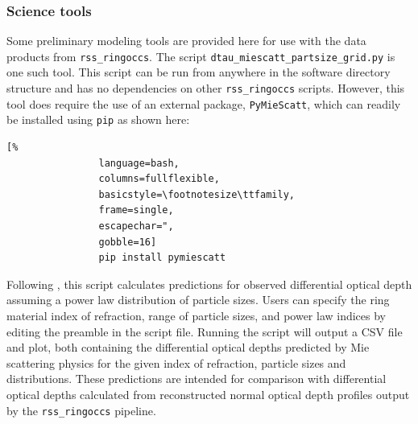 \documentclass[titlepage, 12pt]{article}
\begin{document}
    \subsubsection{Science tools}
            Some preliminary modeling tools are provided here for use with the data products from \texttt{rss\_ringoccs}. The script \texttt{dtau\_miescatt\_partsize\_grid.py} is one such tool. This script can be run from anywhere in the software directory structure and has no dependencies on other \texttt{rss\_ringoccs} scripts. However, this tool does require the use of an external package, \texttt{PyMieScatt}, which can readily be installed using \texttt{pip} as shown here:
            \begin{lstlisting}[%
                language=bash,
                columns=fullflexible,
                basicstyle=\footnotesize\ttfamily,
                frame=single,
                escapechar=",
                gobble=16]
                pip install pymiescatt
            \end{lstlisting}
            Following \citet{Marouf1983}, this script calculates predictions for observed differential optical depth assuming a power law distribution of particle sizes. Users can specify the ring material index of refraction, range of particle sizes, and power law indices by editing the preamble in the script file. Running the script will output a CSV file and plot, both containing the differential optical depths predicted by Mie scattering physics for the given index of refraction, particle sizes and distributions. These predictions are intended for comparison with differential optical depths calculated from reconstructed normal optical depth profiles output by the \texttt{rss\_ringoccs} pipeline.
\end{document}
